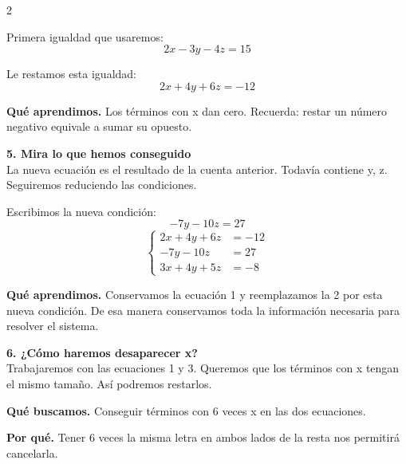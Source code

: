 \documentclass[11pt,a4paper,landscape]{article}
\begin{document}
\begin{multicols*}{2}
\begin{minipage}{\linewidth}
\par\smallskip Primera igualdad que usaremos:
\[2x - 3y - 4z = 15\]
\par\smallskip Le restamos esta igualdad:
\[2x + 4y + 6z = -12\]
\par\smallskip\textbf{Qué aprendimos.} Los términos con x dan cero. Recuerda: restar un número negativo equivale a sumar su opuesto.
\end{minipage}\par\medskip
\noindent\begin{minipage}{\linewidth}\textbf{5. Mira lo que hemos conseguido}\\[2pt]La nueva ecuación es el resultado de la cuenta anterior. Todavía contiene y, z. Seguiremos reduciendo las condiciones.
\par\smallskip Escribimos la nueva condición:
\[-7y - 10z = 27\]
\[\left\{\begin{aligned}2x + 4y + 6z &= -12\\-7y - 10z &= 27\\3x + 4y + 5z &= -8\end{aligned}\right.\]
\par\smallskip\textbf{Qué aprendimos.} Conservamos la ecuación 1 y reemplazamos la 2 por esta nueva condición. De esa manera conservamos toda la información necesaria para resolver el sistema.
\end{minipage}\par\medskip
\noindent\begin{minipage}{\linewidth}\textbf{6. ¿Cómo haremos desaparecer x?}\\[2pt]Trabajaremos con las ecuaciones 1 y 3. Queremos que los términos con x tengan el mismo tamaño. Así podremos restarlos.
\par\smallskip\textbf{Qué buscamos.} Conseguir términos con 6 veces x en las dos ecuaciones.
\par\smallskip\textbf{Por qué.} Tener 6 veces la misma letra en ambos lados de la resta nos permitirá cancelarla.
\par{}\par\smallskip

\end{minipage}
\end{multicols*}
\end{document}
